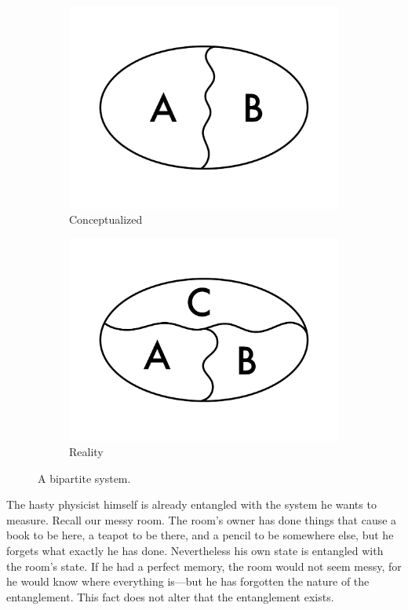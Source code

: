 \begin{figure}[b]
\begin{subfigure}[t]{0.45\textwidth}
    \centering
    \includegraphics[width=\linewidth]{Figures/2part}
    \caption{Conceptualized}
    \label{fig.2part}
\end{subfigure}
\hfill
\begin{subfigure}[t]{0.45\textwidth}
    \centering
    \includegraphics[width=\linewidth]{Figures/3part}
    \caption{Reality}
    \label{fig.3part}
\end{subfigure}
\caption{A bipartite system.}\label{fig.universeparts}
\end{figure}

The hasty physicist himself is already entangled with the system he wants to measure. Recall our messy room. The room’s owner has done things that cause a book to be here, a teapot to be there, and a pencil to be somewhere else, but he forgets what exactly he has done. Nevertheless his own state is entangled with the room’s state. If he had a perfect memory, the room would not seem messy, for he would know where everything is—but he has forgotten the nature of the entanglement. This fact does not alter that the entanglement exists.

